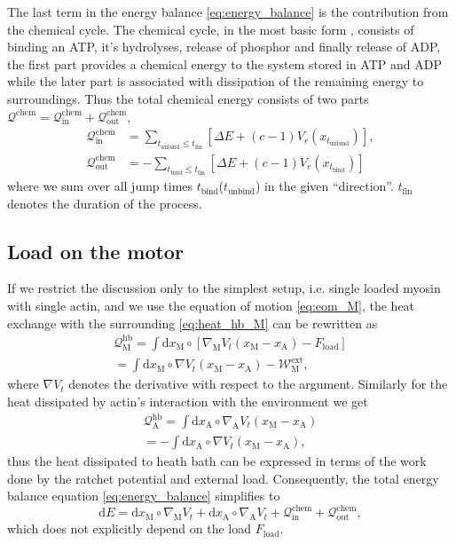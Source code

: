 \documentclass[aps,pre,twocolumn,showpacs,showkeys,superscriptaddress,floatfix]{revtex4-1}
\newcommand{\rmd}{{\mathrm d}}
\begin{document}
The last term in the energy balance \eqref{eq:energy_balance} is the contribution from the chemical cycle. 
The chemical cycle, in the most basic form \cite{}, consists of binding an ATP, it's hydrolyses, release of phosphor and finally release of ADP, %
the first part provides a chemical energy to the system stored in ATP and ADP while the later part is associated with dissipation of the remaining energy to surroundings. 
Thus the total chemical energy consists of two parts ${\mathcal Q}^\text{chem} = {\mathcal Q}^\text{chem}_\text{in} + {\mathcal Q}^\text{chem}_\text{out}$,
\begin{align}
{\mathcal Q}_\text{in}^\text{chem} 
&= \sum_{t_\text{unbind} \leq t_\text{fin} } \left[ \Delta E + (c-1) V_r(x_{t_\text{unbind}}) \right] , 
\label{eq:q_in} \\
{\mathcal Q}_\text{out}^\text{chem} 
&= -\sum_{t_\text{bind} \leq t_\text{fin} } \left[ \Delta E + (c-1) V_r(x_{t_\text{bind}}) \right] 
\label{eq:q_out}
\end{align}
where we sum over all jump times $t_\text{bind}$($t_\text{unbind}$) in the given ``direction''. 
$t_\text{fin}$ denotes the duration of the process. 

\subsection{Load on the motor}
If we restrict the discussion only to the simplest setup, i.e. single loaded myosin with single actin,  
and we use the equation of motion \eqref{eq:eom_M}, 
the heat exchange with the surrounding \eqref{eq:heat_hb_M} can be rewritten as 
\begin{multline*}
{\mathcal Q}_\text{M}^\text{hb} 
= \int \rmd x_\text{M} \circ \left[ \nabla_\text{M} V_t(x_\text{M} - x_\text{A} ) - F_\text{load} \right] 
\\
= \int \rmd x_\text{M} \circ \nabla V_t(x_\text{M} - x_\text{A} ) - {\mathcal W}_\text{M}^\text{ext} ,
\end{multline*}
where $\nabla V_t$ denotes the derivative with respect to the argument. 
Similarly for the heat dissipated by actin's interaction with the environment we get 
\begin{multline*}
{\mathcal Q}_\text{A}^\text{hb} 
= \int \rmd x_\text{A} \circ \nabla_\text{A} V_t(x_\text{M} - x_\text{A} )
\\
= - \int \rmd x_\text{A} \circ \nabla V_t(x_\text{M} - x_\text{A} ) ,
\end{multline*}
thus the heat dissipated to heath bath can be expressed in terms of the work done by the ratchet potential and external load. 
Consequently, the total energy balance equation \eqref{eq:energy_balance} simplifies to 
\[
\rmd E 
= \rmd x_\text{M} \circ \nabla_\text{M} V_t  
+ \rmd x_\text{A} \circ \nabla_\text{A} V_t  
+ {\mathcal Q}_\text{in}^\text{chem}
+ {\mathcal Q}_\text{out}^\text{chem} , 
\]
which does not explicitly depend on the load $F_\text{load}$. 
\end{document}

